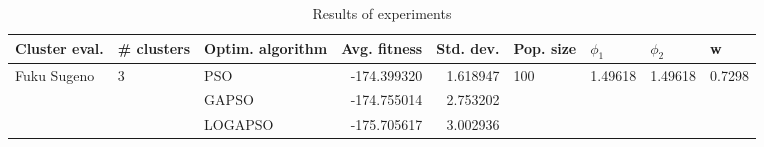\begin{table}
\centering
\caption{Results of experiments}
\begin{tabular}{lllrrllll}
\toprule
               Cluster eval. &        \# clusters & Optim. algorithm &  Avg. fitness &  Std. dev. &            Pop. size &               $\phi_{1}$ &               $\phi_{2}$ &                       w \\
\midrule
\multirow{3}{*}{Fuku Sugeno} & \multirow{3}{*}{3} &              PSO &   -174.399320 &   1.618947 & \multirow{3}{*}{100} & \multirow{3}{*}{1.49618} & \multirow{3}{*}{1.49618} & \multirow{3}{*}{0.7298} \\
                             &                    &            GAPSO &   -174.755014 &   2.753202 &                      &                          &                          &                         \\
                             &                    &          LOGAPSO &   -175.705617 &   3.002936 &                      &                          &                          &                         \\
\bottomrule
\end{tabular}
\end{table}
